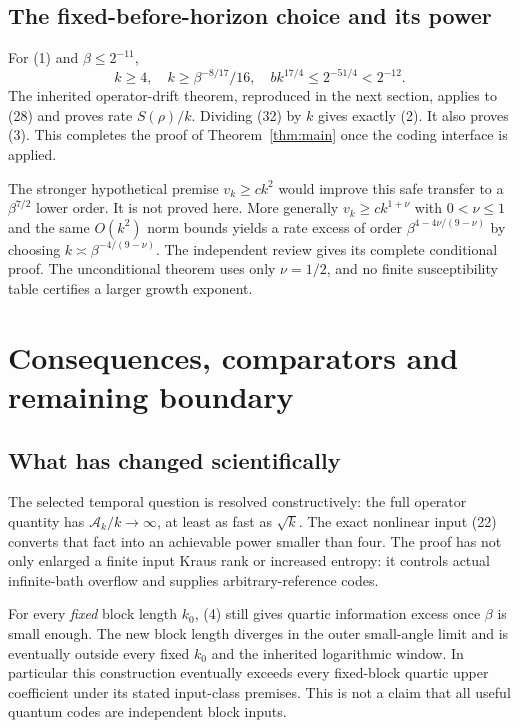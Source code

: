 \documentclass[11pt]{article}
\begin{document}
\subsection{The fixed-before-horizon choice and its power}

For (1) and $\beta\le2^{-11}$,
\[
 k\ge4,\quad k\ge\beta^{-8/17}/16,\quad
 bk^{17/4}\le2^{-51/4}<2^{-12}.
\]
The inherited operator-drift theorem, reproduced in the next section,
applies to (28) and proves rate $S(\rho)/k$. Dividing (32) by $k$
gives exactly (2). It also proves (3). This completes the proof of
Theorem~\ref{thm:main} once the coding interface is applied.

The stronger hypothetical premise $v_k\ge c k^2$ would improve this
safe transfer to a $\beta^{7/2}$ lower order. It is not proved here.
More generally $v_k\ge c k^{1+\nu}$ with $0<\nu\le1$ and the
same $O(k^2)$ norm bounds yields a rate excess of order
$\beta^{4-4\nu/(9-\nu)}$ by choosing
$k\asymp\beta^{-4/(9-\nu)}$. The independent review gives its
complete conditional proof. The unconditional theorem uses only
$\nu=1/2$, and no finite susceptibility table certifies a larger
growth exponent.



\section{Consequences, comparators and remaining boundary}

\subsection{What has changed scientifically}

The selected temporal question is resolved constructively: the full
operator quantity has $\mathcal A_k/k\to\infty$, at least as fast as
$\sqrt{k}$. The exact nonlinear input (22) converts that fact into
an achievable power smaller than four. The proof has not only enlarged
a finite input Kraus rank or increased entropy: it controls actual
infinite-bath overflow and supplies arbitrary-reference codes.

For every \emph{fixed} block length $k_0$, (4) still gives quartic
information excess once $\beta$ is small enough. The new block length
diverges in the outer small-angle limit and is eventually outside every
fixed $k_0$ and the inherited logarithmic window. In particular this
construction eventually exceeds every fixed-block quartic upper
coefficient under its stated input-class premises. This is not a claim
that all useful quantum codes are independent block inputs.
\end{document}
